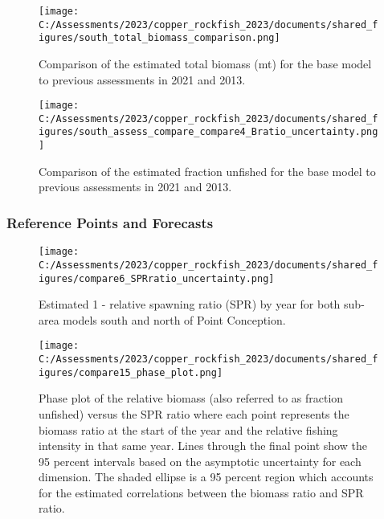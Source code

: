 \documentclass[11pt,
  english,
  letterpaper,
]{article}
\begin{document}
\begin{figure}
\centering
\texttt{[image: C:/Assessments/2023/copper\_rockfish\_2023/documents/shared\_figures/south\_total\_biomass\_comparison.png]}
\caption{Comparison of the estimated total biomass (mt) for the base model to previous assessments in 2021 and 2013.\label{fig:comp-assess-sb}}
\end{figure}

\newpage

\begin{figure}
\centering
\texttt{[image: C:/Assessments/2023/copper\_rockfish\_2023/documents/shared\_figures/south\_assess\_compare\_compare4\_Bratio\_uncertainty.png]}
\caption{Comparison of the estimated fraction unfished for the base model to previous assessments in 2021 and 2013.\label{fig:comp-assess-depl}}
\end{figure}

\newpage

\hypertarget{reference-points-and-forecasts}{%
\subsubsection{Reference Points and Forecasts}\label{reference-points-and-forecasts}}

\begin{figure}
\centering
\texttt{[image: C:/Assessments/2023/copper\_rockfish\_2023/documents/shared\_figures/compare6\_SPRratio\_uncertainty.png]}
\caption{Estimated 1 - relative spawning ratio (SPR) by year for both sub-area models south and north of Point Conception.\label{fig:1-spr}}
\end{figure}

\clearpage

\begin{figure}
\centering
\texttt{[image: C:/Assessments/2023/copper\_rockfish\_2023/documents/shared\_figures/compare15\_phase\_plot.png]}
\caption{Phase plot of the relative biomass (also referred to as fraction unfished) versus the SPR ratio where each point represents the biomass ratio at the start of the year and the relative fishing intensity in that same year. Lines through the final point show the 95 percent intervals based on the asymptotic uncertainty for each dimension. The shaded ellipse is a 95 percent region which accounts for the estimated correlations between the biomass ratio and SPR ratio.\label{fig:phase}}
\end{figure}
\end{document}

